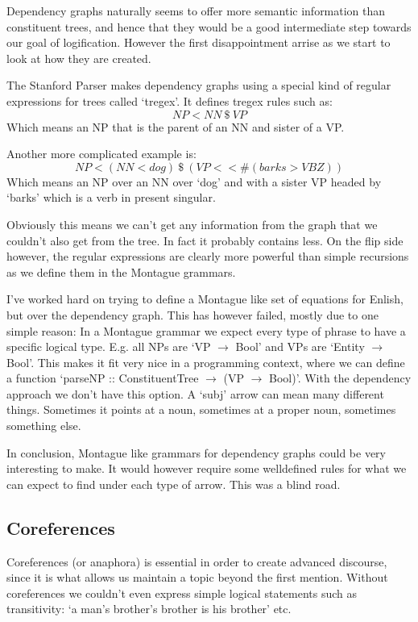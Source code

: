 \documentclass[12pt]{article}
\begin{document}
Dependency graphs naturally seems to offer more semantic information than constituent trees, and hence that they would be a good intermediate step towards our goal of logification. However the first disappointment arrise as we start to look at how they are created.

The Stanford Parser makes dependency graphs using a special kind of regular expressions for trees called `tregex'\cite{de2006generating}. It defines tregex rules such as:
%
\begin{equation}
NP < NN\ \$\ VP
\end{equation}
Which means an NP that is the parent of an NN and sister of a VP.

Another more complicated example is:
\begin{equation}
NP < (NN < dog)\ \$\ (VP <\!\!<\# (barks > VBZ))
\end{equation}
Which means an NP over an NN over `dog' and with a sister VP headed by `barks' which is a verb in present singular.

Obviously this means we can't get any information from the graph that we couldn't also get from the tree. In fact it probably contains less. On the flip side however, the regular expressions are clearly more powerful than simple recursions as we define them in the Montague grammars.

I've worked hard on trying to define a Montague like set of equations for Enlish, but over the dependency graph. This has however failed, mostly due to one simple reason: In a Montague grammar we expect every type of phrase to have a specific logical type. E.g. all NPs are `VP $\rightarrow$ Bool' and VPs are `Entity $\rightarrow$ Bool'. This makes it fit very nice in a programming context, where we can define a function `parseNP :: ConstituentTree $\rightarrow$ (VP $\rightarrow$ Bool)'. With the dependency approach we don't have this option. A `subj' arrow can mean many different things. Sometimes it points at a noun, sometimes at a proper noun, sometimes something else.

In conclusion, Montague like grammars for dependency graphs could be very interesting to make. It would however require some welldefined rules for what we can expect to find under each type of arrow. This was a blind road.

\subsection{Coreferences}\label{sec:coreferences}
Coreferences (or anaphora) is essential in order to create advanced discourse, since it is what allows us maintain a topic beyond the first mention. Without coreferences we couldn't even express simple logical statements such as transitivity: `a man's brother's brother is his brother' etc.
\end{document}
